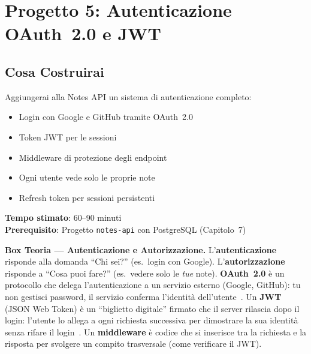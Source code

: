 \chapter{Progetto 5: Autenticazione OAuth~2.0 e JWT}

\section*{Cosa Costruirai}
Aggiungerai alla Notes API un sistema di autenticazione completo:
\begin{itemize}
  \item Login con Google e GitHub tramite OAuth~2.0
  \item Token JWT per le sessioni
  \item Middleware di protezione degli endpoint
  \item Ogni utente vede solo le proprie note
  \item Refresh token per sessioni persistenti
\end{itemize}

\textbf{Tempo stimato}: 60--90 minuti\\
\textbf{Prerequisito}: Progetto \texttt{notes-api} con PostgreSQL (Capitolo~7)

\begin{notebox}
\textbf{Box Teoria --- Autenticazione e Autorizzazione.} L'\textbf{autenticazione} risponde alla domanda ``Chi sei?'' (es.\ login con Google). L'\textbf{autorizzazione} risponde a ``Cosa puoi fare?'' (es.\ vedere solo le \textit{tue} note). \textbf{OAuth~2.0} è un protocollo che delega l'autenticazione a un servizio esterno (Google, GitHub): tu non gestisci password, il servizio conferma l'identità dell'utente~\cite{rfc6749}. Un \textbf{JWT} (JSON Web Token) è un ``biglietto digitale'' firmato che il server rilascia dopo il login: l'utente lo allega a ogni richiesta successiva per dimostrare la sua identità senza rifare il login~\cite{rfc7519}. Un \textbf{middleware} è codice che si inserisce tra la richiesta e la risposta per svolgere un compito trasversale (come verificare il JWT).
\end{notebox}

